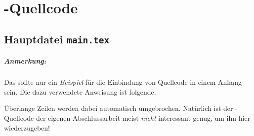 \chapter{\latex-Quellcode}
\label{app:latex}

\section*{Hauptdatei \texttt{main.tex}}

\paragraph{Anmerkung:}
Das sollte nur ein \emph{Beispiel} für die Einbindung von Quellcode
in einem Anhang sein. Die dazu verwendete Anweisung ist folgende:
%
\begin{LaTeXCode}[numbers=none]

\end{LaTeXCode}
%
Überlange Zeilen werden dabei automatisch umgebrochen. Natürlich ist der
\latex-Quellcode der eigenen Abschlussarbeit meist \emph{nicht} interessant
genug, um ihn hier wiederzugeben!


